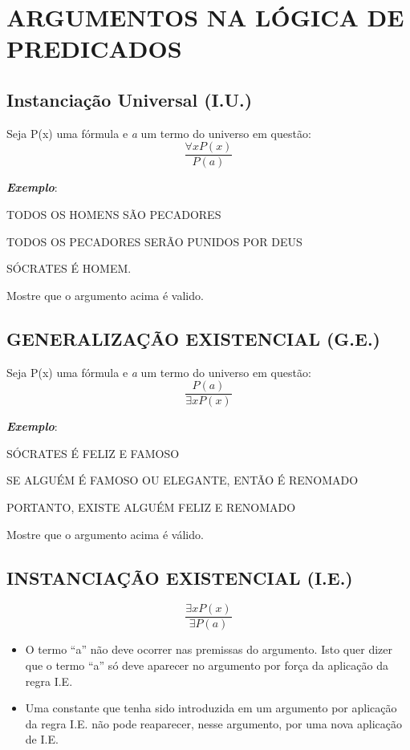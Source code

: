 \chapter{ARGUMENTOS NA LÓGICA DE PREDICADOS}

\section{Instanciação Universal (I.U.)}
Seja P(x) uma fórmula e \textit{a} um termo do universo em questão:
\[
\boxed{\frac{\forall x P(x)}{P(a)}}
\]

\noindent \textit{\textbf{Exemplo}}:

TODOS OS HOMENS SÃO PECADORES

TODOS OS PECADORES SERÃO PUNIDOS POR DEUS

SÓCRATES É HOMEM.


\noindent Mostre que o argumento acima é valido.

\section{GENERALIZAÇÃO EXISTENCIAL (G.E.)}
Seja P(x) uma fórmula e \textit{a} um termo do universo em questão:
\[
\boxed{\frac{P(a)}{\exists x P(x)}}
\]

\noindent \textit{\textbf{Exemplo}}:

SÓCRATES É FELIZ E FAMOSO

SE ALGUÉM É FAMOSO OU ELEGANTE, ENTÃO É RENOMADO

PORTANTO, EXISTE ALGUÉM FELIZ E RENOMADO

\noindent Mostre que o argumento acima é válido.

\section{INSTANCIAÇÃO EXISTENCIAL (I.E.)}

\[
\boxed{\frac{\exists x P(x)}{\exists P(a)}}
\]

\begin{itemize}
    \item O termo ``a'' não deve ocorrer nas premissas do argumento. Isto quer dizer que o termo ``a'' só deve aparecer no argumento por força da aplicação da regra I.E.
    \item Uma constante que tenha sido introduzida em um argumento por aplicação da regra I.E. não pode reaparecer, nesse argumento, por uma nova aplicação de I.E.
\end{itemize}

